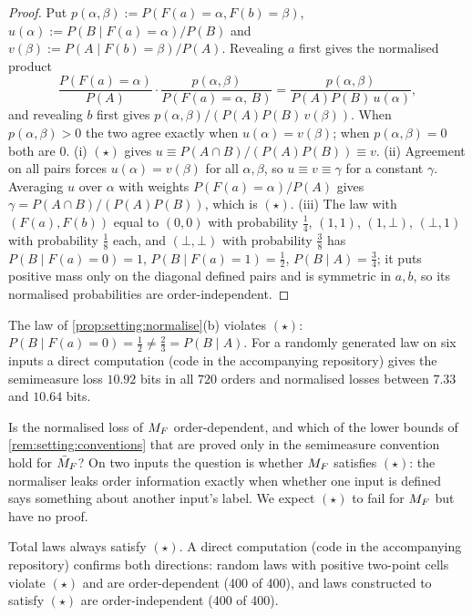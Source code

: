 \begin{proof}
Put $p(\alpha,\beta):=P(F(a)=\alpha,F(b)=\beta)$, $u(\alpha):=P(B\mid F(a)=\alpha)/P(B)$ and $v(\beta):=P(A\mid F(b)=\beta)/P(A)$. Revealing $a$ first gives the normalised product
\[
\frac{P(F(a)=\alpha)}{P(A)}\cdot\frac{p(\alpha,\beta)}{P(F(a)=\alpha,\,B)}=\frac{p(\alpha,\beta)}{P(A)P(B)\,u(\alpha)},
\]
and revealing $b$ first gives $p(\alpha,\beta)/(P(A)P(B)\,v(\beta))$. When $p(\alpha,\beta)>0$ the two agree exactly when $u(\alpha)=v(\beta)$; when $p(\alpha,\beta)=0$ both are $0$. (i) $(\star)$ gives $u\equiv P(A\cap B)/(P(A)P(B))\equiv v$. (ii) Agreement on all pairs forces $u(\alpha)=v(\beta)$ for all $\alpha,\beta$, so $u\equiv v\equiv\gamma$ for a constant $\gamma$. Averaging $u$ over $\alpha$ with weights $P(F(a)=\alpha)/P(A)$ gives $\gamma=P(A\cap B)/(P(A)P(B))$, which is $(\star)$. (iii) The law with $(F(a),F(b))$ equal to $(0,0)$ with probability $\frac14$, $(1,1)$, $(1,\bot)$, $(\bot,1)$ with probability $\frac18$ each, and $(\bot,\bot)$ with probability $\frac38$ has $P(B\mid F(a)=0)=1$, $P(B\mid F(a)=1)=\frac12$, $P(B\mid A)=\frac34$; it puts positive mass only on the diagonal defined pairs and is symmetric in $a,b$, so its normalised probabilities are order-independent.
\end{proof}

The law of \cref{prop:setting:normalise}(b) violates $(\star)$: $P(B\mid F(a)=0)=\frac12\ne\frac23=P(B\mid A)$. For a randomly generated law on six inputs a direct computation (code in the accompanying repository) gives the semimeasure loss $10.92$ bits in all $720$ orders and normalised losses between $7.33$ and $10.64$ bits.

\begin{question}\label{q:setting:normorder}
Is the normalised loss of $M_{F}$ order-dependent, and which of the lower bounds of \cref{rem:setting:conventions} that are proved only in the semimeasure convention hold for $\bar{M}_{F}$? On two inputs the question is whether $M_{F}$ satisfies $(\star)$: the normaliser leaks order information exactly when whether one input is defined says something about another input's label. We expect $(\star)$ to fail for $M_{F}$ but have no proof.
\end{question}

Total laws always satisfy $(\star)$. A direct computation (code in the accompanying repository) confirms both directions: random laws with positive two-point cells violate $(\star)$ and are order-dependent (400 of 400), and laws constructed to satisfy $(\star)$ are order-independent (400 of 400).

